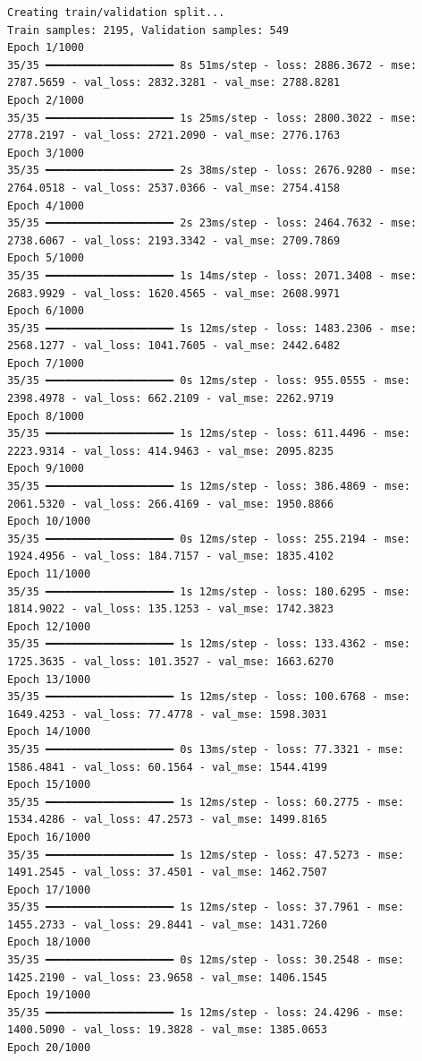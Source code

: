 \documentclass[
  letterpaper,
  DIV=11,
  numbers=noendperiod]{scrreprt}
\begin{document}
\begin{verbatim}
Creating train/validation split...
Train samples: 2195, Validation samples: 549
Epoch 1/1000
35/35 ━━━━━━━━━━━━━━━━━━━━ 8s 51ms/step - loss: 2886.3672 - mse: 2787.5659 - val_loss: 2832.3281 - val_mse: 2788.8281
Epoch 2/1000
35/35 ━━━━━━━━━━━━━━━━━━━━ 1s 25ms/step - loss: 2800.3022 - mse: 2778.2197 - val_loss: 2721.2090 - val_mse: 2776.1763
Epoch 3/1000
35/35 ━━━━━━━━━━━━━━━━━━━━ 2s 38ms/step - loss: 2676.9280 - mse: 2764.0518 - val_loss: 2537.0366 - val_mse: 2754.4158
Epoch 4/1000
35/35 ━━━━━━━━━━━━━━━━━━━━ 2s 23ms/step - loss: 2464.7632 - mse: 2738.6067 - val_loss: 2193.3342 - val_mse: 2709.7869
Epoch 5/1000
35/35 ━━━━━━━━━━━━━━━━━━━━ 1s 14ms/step - loss: 2071.3408 - mse: 2683.9929 - val_loss: 1620.4565 - val_mse: 2608.9971
Epoch 6/1000
35/35 ━━━━━━━━━━━━━━━━━━━━ 1s 12ms/step - loss: 1483.2306 - mse: 2568.1277 - val_loss: 1041.7605 - val_mse: 2442.6482
Epoch 7/1000
35/35 ━━━━━━━━━━━━━━━━━━━━ 0s 12ms/step - loss: 955.0555 - mse: 2398.4978 - val_loss: 662.2109 - val_mse: 2262.9719
Epoch 8/1000
35/35 ━━━━━━━━━━━━━━━━━━━━ 1s 12ms/step - loss: 611.4496 - mse: 2223.9314 - val_loss: 414.9463 - val_mse: 2095.8235
Epoch 9/1000
35/35 ━━━━━━━━━━━━━━━━━━━━ 1s 12ms/step - loss: 386.4869 - mse: 2061.5320 - val_loss: 266.4169 - val_mse: 1950.8866
Epoch 10/1000
35/35 ━━━━━━━━━━━━━━━━━━━━ 0s 12ms/step - loss: 255.2194 - mse: 1924.4956 - val_loss: 184.7157 - val_mse: 1835.4102
Epoch 11/1000
35/35 ━━━━━━━━━━━━━━━━━━━━ 1s 12ms/step - loss: 180.6295 - mse: 1814.9022 - val_loss: 135.1253 - val_mse: 1742.3823
Epoch 12/1000
35/35 ━━━━━━━━━━━━━━━━━━━━ 1s 12ms/step - loss: 133.4362 - mse: 1725.3635 - val_loss: 101.3527 - val_mse: 1663.6270
Epoch 13/1000
35/35 ━━━━━━━━━━━━━━━━━━━━ 1s 12ms/step - loss: 100.6768 - mse: 1649.4253 - val_loss: 77.4778 - val_mse: 1598.3031
Epoch 14/1000
35/35 ━━━━━━━━━━━━━━━━━━━━ 0s 13ms/step - loss: 77.3321 - mse: 1586.4841 - val_loss: 60.1564 - val_mse: 1544.4199
Epoch 15/1000
35/35 ━━━━━━━━━━━━━━━━━━━━ 1s 12ms/step - loss: 60.2775 - mse: 1534.4286 - val_loss: 47.2573 - val_mse: 1499.8165
Epoch 16/1000
35/35 ━━━━━━━━━━━━━━━━━━━━ 1s 12ms/step - loss: 47.5273 - mse: 1491.2545 - val_loss: 37.4501 - val_mse: 1462.7507
Epoch 17/1000
35/35 ━━━━━━━━━━━━━━━━━━━━ 1s 12ms/step - loss: 37.7961 - mse: 1455.2733 - val_loss: 29.8441 - val_mse: 1431.7260
Epoch 18/1000
35/35 ━━━━━━━━━━━━━━━━━━━━ 0s 12ms/step - loss: 30.2548 - mse: 1425.2190 - val_loss: 23.9658 - val_mse: 1406.1545
Epoch 19/1000
35/35 ━━━━━━━━━━━━━━━━━━━━ 1s 12ms/step - loss: 24.4296 - mse: 1400.5090 - val_loss: 19.3828 - val_mse: 1385.0653
Epoch 20/1000

\end{verbatim}
\end{document}
